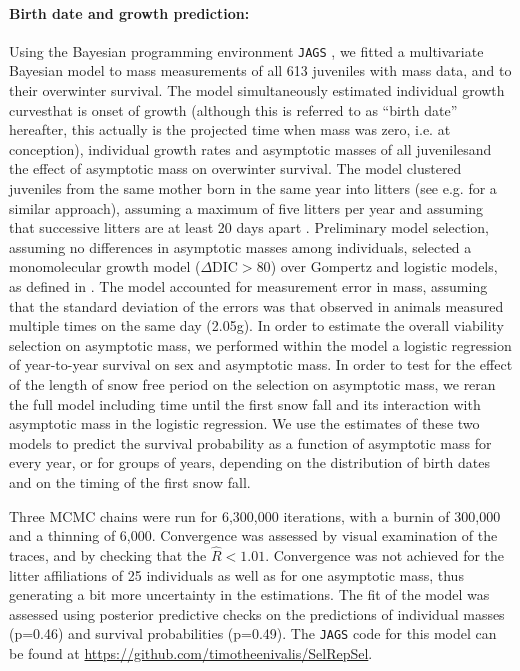 \paragraph{Birth date and growth prediction: }
Using the Bayesian programming environment \verb+JAGS+ \parencite{Plummer2003}, we fitted a multivariate Bayesian model to mass measurements of all 613 juveniles with mass data, and to their overwinter survival. The model simultaneously estimated individual growth curves\textemdash that is onset of growth (although this is referred to as ``birth date'' hereafter, this actually is the projected time when mass was zero, i.e. at conception), individual growth rates and asymptotic masses of all juveniles\textemdash and the effect of asymptotic mass on overwinter survival. The model clustered juveniles from the same mother born in the same year into litters (see e.g. \parencite{Cornulier2009} for a similar approach), assuming a maximum of five litters per year and assuming that successive litters are at least 20 days apart \parencite{Janeau1997}. Preliminary model selection, assuming no differences in asymptotic masses among individuals, selected a monomolecular growth model ($\Delta \mathrm{DIC} > 80$) over Gompertz and logistic models, as defined in \parencite{English2012}. The model accounted for measurement error in mass, assuming that the standard deviation of the errors was that observed in animals measured multiple times on the same day (2.05g).
In order to estimate the overall viability selection on asymptotic mass, we performed within the model a logistic regression of year-to-year survival on sex and asymptotic mass. In order to test for the effect of the length of snow free period on the selection on asymptotic mass, we reran the full model including time until the first snow fall and its interaction with asymptotic mass in the logistic regression. We use the estimates of these two models to predict the survival probability as a function of asymptotic mass for every year, or for groups of years, depending on the distribution of birth dates and on the timing of the first snow fall. 


Three MCMC chains were run for 6,300,000 iterations, with a burnin of 300,000 and a thinning of 6,000. Convergence was assessed by visual examination of the traces, and by checking that the $\hat{R}<1.01$. Convergence was not achieved for the litter affiliations of 25 individuals as well as for one asymptotic mass, thus generating a bit more uncertainty in the estimations. The fit of the model was assessed using posterior predictive checks on the predictions of individual masses (p=0.46) and survival probabilities (p=0.49).  
The \verb+JAGS+ code for this model can be found at \url{https://github.com/timotheenivalis/SelRepSel}.


